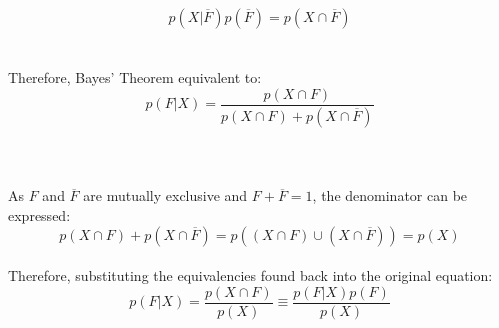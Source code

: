 \documentclass{amsart}
\theoremstyle{definition}
\theoremstyle{Exercise}
\theoremstyle{remark}
\theoremstyle{rule}
\numberwithin{equation}{section}
\begin{document}
\begin{enumerate}[label=(\alph*)]
     $$p(X|\overline{F})p(\overline{F}) = p(X \cap \overline{F})$$\\\\
     \vspace{0.2in}
     Therefore, Bayes' Theorem equivalent to:\\
     $$p(F|X)=\frac{p(X \cap F)}{p(X \cap F)+p(X \cap \overline{F})}$$\\
     \\\\
     As $F$ and $\overline{F}$ are mutually exclusive and $F+\overline{F}=1$, the denominator can be expressed:\\
     $$p(X \cap F)+p(X \cap \overline{F})=p((X \cap F)\cup (X \cap \overline{F}))=p(X)$$\\
     Therefore, substituting the equivalencies found back into the original equation:\\
     $$p(F|X) = \frac{p(X \cap F)}{p(X)} \equiv \frac{p(F|X)p(F)}{p(X)}$$
     \\\\
 \end{enumerate}
\end{document}

